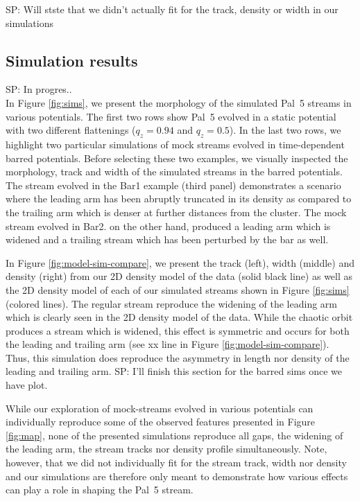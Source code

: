 \documentclass[twocolumn]{aastex62}
\newcommand{\kms}{\ensuremath{\textrm{km}~\textrm{s}^{-1}}}
\newcommand{\sa}[1]{{\color{magenta} SP: #1}}
\begin{document}
\sa{Will stste that we didn't actually fit for the track, density or width in our simulations} 

\subsection{Simulation results}
\label{sec:sim_results}
\sa{In progres..}\\
In Figure \ref{fig:sims}, we present the morphology of the simulated Pal~5 streams in various potentials.
The first two rows show Pal~5 evolved in a static potential with two different flattenings ($q_z = 0.94$ and $q_z = 0.5$).
In the last two rows, we highlight two particular simulations of mock streams evolved in time-dependent barred potentials. Before selecting these two examples, we visually inspected the morphology, track and width of the simulated streams in the barred potentials. 
The stream evolved in the Bar1 example (third panel) demonstrates a scenario where the leading arm has been abruptly truncated in its density as compared to the trailing arm which is denser at further distances from the cluster. The mock stream evolved in Bar2. on the other hand, produced a leading arm which is widened and a trailing stream which has been perturbed by the bar as well. 

In Figure \ref{fig:model-sim-compare}, we present the track (left), width (middle) and density (right) from our 2D density model of the data (solid black line) as well as the 2D density model of each of our simulated streams shown in Figure \ref{fig:sims} (colored lines). %
The regular stream reproduce the widening of the leading arm which is clearly seen in the 2D density model of the data. 
While the chaotic orbit produces a stream which is widened, this effect is symmetric and occurs for both the leading and trailing arm (see xx line in Figure \ref{fig:model-sim-compare}). Thus, this simulation does reproduce the asymmetry in length nor density of the leading and trailing arm. \sa{I'll finish this section for the barred sims once we have plot.}

While our exploration of mock-streams evolved in various potentials can individually reproduce some of the observed features presented in Figure \ref{fig:map}, none of the presented simulations reproduce all gaps, the widening of the leading arm, the stream tracks nor density profile simultaneously. Note, however, that we did not individually fit for the stream track, width nor density and our simulations are therefore only meant to demonstrate how various effects can play a role in shaping the Pal~5 stream. 
\end{document}

